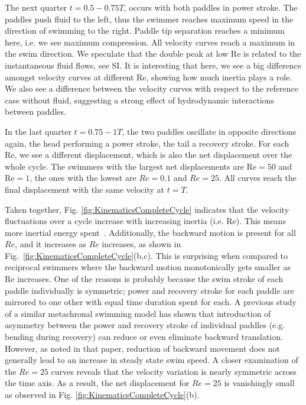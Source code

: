 \documentclass[%
 onecolumn,
superscriptaddress,
 amsmath,amssymb,
 aps,
longbibliography
]{revtex4-2}
\begin{document}
The next quarter $t = 0.5 - 0.75 T$, occurs with both paddles in power stroke. The paddles  push fluid to the left, thus the swimmer reaches maximum speed in the direction of swimming to the right. Paddle tip separation reaches a minimum here, i.e. we see maximum compression. All velocity curves reach a maximum in the swim direction. We speculate that the double peak at low Re is related to the instantaneous fluid flows, see SI. It is interesting that here, we see a big difference amongst velocity curves at different Re, showing how much inertia plays a role. We also see a difference between the velocity curves with respect to the reference case without fluid, suggesting a strong effect of hydrodynamic interactions between paddles.

In the last quarter $t = 0.75 - 1T$, the two paddles oscillate in opposite directions again, the head performing a power stroke, the tail a recovery stroke. For each Re, we see a different displacement, which is also the net displacement over the whole cycle. The swimmers with the largest net displacements are Re$=50$ and Re$=1$, the ones with the lowest are $Re=0.1$ and $Re=25$. All curves reach the final displacement with the same velocity at $t = T$.  

Taken together, Fig. \ref{fig:KinematicsCompleteCycle} indicates that the velocity fluctuations over a cycle increase with increasing inertia (i.e. Re). This means more inertial energy spent~\cite{Kwak2017Design}. Additionally, the backward motion is present for all $Re$, and it increases as $Re$ increases, as shown in Fig.~\ref{fig:KinematicsCompleteCycle}(b,c). This is surprising when compared to reciprocal swimmers where the backward motion monotonically gets smaller as Re increases. One of the reasons is probably because the swim stroke of each paddle individually is symmetric; power and recovery stroke for each paddle are mirrored to one other with equal time duration spent for each.
A previous study~\cite{Kwak2017Design} of a similar metachronal swimming model has shown that introduction of asymmetry between the power and recovery stroke of individual paddles (e.g. bending during recovery) can reduce or even eliminate backward translation. However, as noted in that paper, reduction of backward movement does not generally lead to an increase in steady state swim speed. 
A closer examination of the $Re = 25$ curves reveals that the velocity variation is nearly symmetric across the time axis. As a result, the net displacement for $Re = 25$ is vanishingly small as observed in Fig. \ref{fig:KinematicsCompleteCycle}(b).
\end{document}
